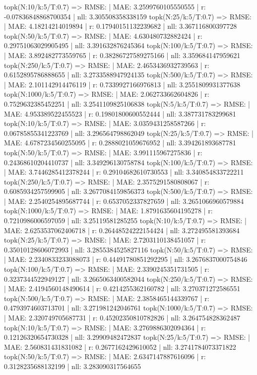 topk(N:10/k:5/T:0.7) => RMSE: | MAE: 3.2599760105550555 | r: -0.07836848868700354 | nll: 3.305508358338159
topk(N:25/k:5/T:0.7) => RMSE: | MAE: 4.18214214019894 | r: 0.17940151132239682 | nll: 3.367116800397728
topk(N:50/k:5/T:0.7) => RMSE: | MAE: 4.630480732882424 | r: 0.29751063029905495 | nll: 3.391632876245364
topk(N:100/k:5/T:0.7) => RMSE: | MAE: 3.892482773559765 | r: 0.38286727589275166 | nll: 3.359684147959621
topk(N:250/k:5/T:0.7) => RMSE: | MAE: 2.4653436932739563 | r: 0.6152895786888655 | nll: 3.2733588947924135
topk(N:500/k:5/T:0.7) => RMSE: | MAE: 2.101142914476119 | r: 0.7339927166976813 | nll: 3.2551809931377638
topk(N:1000/k:5/T:0.7) => RMSE: | MAE: 2.062733662604826 | r: 0.7529632385452251 | nll: 3.2541109825106838
topk(N:5/k:5/T:0.7) => RMSE: | MAE: 4.953389522455523 | r: 0.19801800600552444 | nll: 3.387731783299681
topk(N:10/k:5/T:0.7) => RMSE: | MAE: 3.0359431258587266 | r: 0.06785855341223769 | nll: 3.296564798862049
topk(N:25/k:5/T:0.7) => RMSE: | MAE: 4.6787234560255095 | r: 0.2888021059676952 | nll: 3.394261893687781
topk(N:50/k:5/T:0.7) => RMSE: | MAE: 3.991115967275836 | r: 0.24368610204410737 | nll: 3.349296130758784
topk(N:100/k:5/T:0.7) => RMSE: | MAE: 3.7446285412378244 | r: 0.29104682610730553 | nll: 3.340854833722211
topk(N:250/k:5/T:0.7) => RMSE: | MAE: 2.3575291580808067 | r: 0.6085934257599905 | nll: 3.2677084159856373
topk(N:500/k:5/T:0.7) => RMSE: | MAE: 2.2540254895687744 | r: 0.6537052337827659 | nll: 3.2651066960579884
topk(N:1000/k:5/T:0.7) => RMSE: | MAE: 1.8791635604195278 | r: 0.7210986006597059 | nll: 3.25119581285255
topk(N:10/k:5/T:0.7) => RMSE: | MAE: 2.6253537062406718 | r: 0.26448524222154424 | nll: 3.272495581393684
topk(N:25/k:5/T:0.7) => RMSE: | MAE: 2.7203110138451057 | r: 0.35010128606072993 | nll: 3.2855384525827116
topk(N:50/k:5/T:0.7) => RMSE: | MAE: 2.2340833233088073 | r: 0.44491780851292295 | nll: 3.2676837000754846
topk(N:100/k:5/T:0.7) => RMSE: | MAE: 2.3390245351731505 | r: 0.3237344522949127 | nll: 3.2665063400582044
topk(N:250/k:5/T:0.7) => RMSE: | MAE: 2.4194560148490614 | r: 0.4214255362160782 | nll: 3.270371272586551
topk(N:500/k:5/T:0.7) => RMSE: | MAE: 2.3858465144339767 | r: 0.4793974603713701 | nll: 3.271981242046761
topk(N:1000/k:5/T:0.7) => RMSE: | MAE: 2.320749705687731 | r: 0.45202350810782826 | nll: 3.264754828362487
topk(N:10/k:5/T:0.7) => RMSE: | MAE: 3.2769886302094364 | r: 0.12126320654730328 | nll: 3.29909482472837
topk(N:25/k:5/T:0.7) => RMSE: | MAE: 2.560831431831082 | r: 0.2677162429610052 | nll: 3.2741784073371822
topk(N:50/k:5/T:0.7) => RMSE: | MAE: 2.6347147887616096 | r: 0.3128235688132199 | nll: 3.283090317564655
